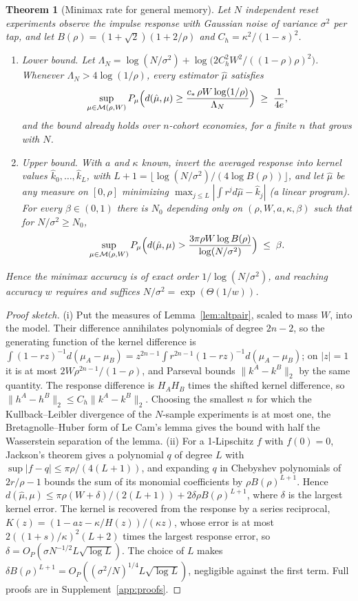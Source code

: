 \documentclass[12pt]{article}
\newtheorem{theorem}{Theorem}[section]
\theoremstyle{definition}
\theoremstyle{remark}
\begin{document}
\begin{theorem}[Minimax rate for general memory]\label{thm:general}
Let $N$ independent reset experiments observe the impulse response with Gaussian noise of variance $\sigma^2$ per tap, and let $B(\rho)=(1+\sqrt2)(1+2/\rho)$ and $C_h=\kappa^2/(1-s)^2$.
\begin{enumerate}[label=(\roman*)]
\item \emph{Lower bound.} Let $\Lambda_N=\log(N/\sigma^2)+\log\bigl(2C_h^2W^2/((1-\rho)\rho)^2\bigr)$. Whenever $\Lambda_N>4\log(1/\rho)$, every estimator $\hat\mu$ satisfies
\[
\sup_{\mu\in\mathcal M(\rho,W)}P_\mu\Bigl(d(\hat\mu,\mu)\ge\frac{c_*\,\rho W\log(1/\rho)}{\Lambda_N}\Bigr)\;\ge\;\frac1{4e},
\]
and the bound already holds over $n$-cohort economies, for a finite $n$ that grows with $N$.
\item \emph{Upper bound.} With $a$ and $\kappa$ known, invert the averaged response into kernel values $\hat k_0,\ldots,\hat k_L$, with $L+1=\lfloor\log(N/\sigma^2)/(4\log B(\rho))\rfloor$, and let $\hat\mu$ be any measure on $[0,\rho]$ minimizing $\max_{j\le L}|\int r^jd\hat\mu-\hat k_j|$ (a linear program). For every $\beta\in(0,1)$ there is $N_0$ depending only on $(\rho,W,a,\kappa,\beta)$ such that for $N/\sigma^2\ge N_0$,
\[
\sup_{\mu\in\mathcal M(\rho,W)}P_\mu\Bigl(d(\hat\mu,\mu)>\frac{3\pi\rho W\log B(\rho)}{\log(N/\sigma^2)}\Bigr)\;\le\;\beta .
\]
\end{enumerate}
Hence the minimax accuracy is of exact order $1/\log(N/\sigma^2)$, and reaching accuracy $w$ requires and suffices $N/\sigma^2=\exp(\Theta(1/w))$.
\end{theorem}

\begin{proof}[Proof sketch]
(i) Put the measures of Lemma~\ref{lem:altpair}, scaled to mass $W$, into the model. Their difference annihilates polynomials of degree $2n-2$, so the generating function of the kernel difference is $\int(1-rz)^{-1}d(\mu_A-\mu_B)=z^{2n-1}\int r^{2n-1}(1-rz)^{-1}d(\mu_A-\mu_B)$; on $|z|=1$ it is at most $2W\rho^{2n-1}/(1-\rho)$, and Parseval bounds $\|k^A-k^B\|_2$ by the same quantity. The response difference is $H_AH_B$ times the shifted kernel difference, so $\|h^A-h^B\|_2\le C_h\|k^A-k^B\|_2$. Choosing the smallest $n$ for which the Kullback--Leibler divergence of the $N$-sample experiments is at most one, the Bretagnolle--Huber form of Le Cam's lemma gives the bound with half the Wasserstein separation of the lemma. (ii) For a 1-Lipschitz $f$ with $f(0)=0$, Jackson's theorem gives a polynomial $q$ of degree $L$ with $\sup|f-q|\le\pi\rho/(4(L+1))$, and expanding $q$ in Chebyshev polynomials of $2r/\rho-1$ bounds the sum of its monomial coefficients by $\rho B(\rho)^{L+1}$. Hence $d(\hat\mu,\mu)\le\pi\rho(W+\delta)/(2(L+1))+2\delta\rho B(\rho)^{L+1}$, where $\delta$ is the largest kernel error. The kernel is recovered from the response by a series reciprocal, $K(z)=(1-az-\kappa/H(z))/(\kappa z)$, whose error is at most $2((1+s)/\kappa)^2(L+2)$ times the largest response error, so $\delta=O_P(\sigma N^{-1/2}L\sqrt{\log L})$. The choice of $L$ makes $\delta B(\rho)^{L+1}=O_P((\sigma^2/N)^{1/4}L\sqrt{\log L})$, negligible against the first term. Full proofs are in Supplement~\ref{app:proofs}.
\end{proof}
\end{document}
